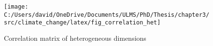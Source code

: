 \begin{figure}[H]
    \centering
    \texttt{[image: C:/Users/david/OneDrive/Documents/ULMS/PhD/Thesis/chapter3/src/climate\_change/latex/fig\_correlation\_het]}
    \caption{Correlation matrix of heterogeneous dimensions}
    \label{fig:correlation-het}
\end{figure}